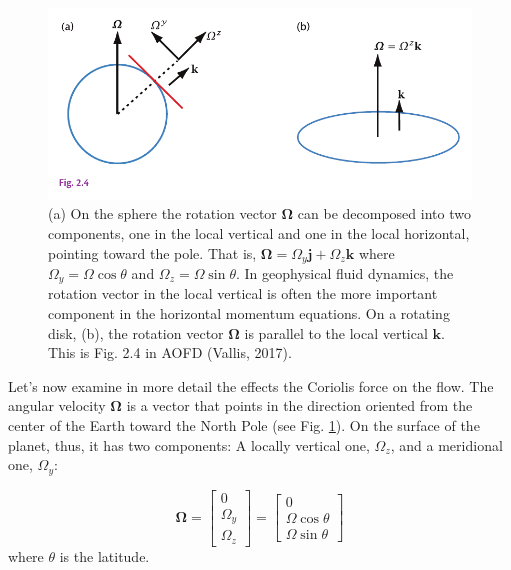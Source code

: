 \documentclass[12pt]{article}
\numberwithin{equation}{section}
\numberwithin{figure}{section}
\numberwithin{table}{section}
\begin{document}
\begin{figure}[h]
  \centering
  \includegraphics[width=\textwidth]{assets/fig_rotation_components.pdf}
  \caption{
    (a) On the sphere the rotation vector $\mathbf{\Omega}$ can be decomposed
    into two components, one in the local vertical and one in the local horizontal,
    pointing toward the pole. That is, $\mathbf{\Omega} = \Omega_y \mathbf{j} + \Omega_z \mathbf{k}$
    where $\Omega_y = \Omega \cos\theta$ and $\Omega_z = \Omega \sin\theta$.
    In geophysical fluid dynamics, the rotation vector in the local vertical
    is often the more important component in the horizontal momentum equations.
    On a rotating disk, (b), the rotation vector $\mathbf{\Omega}$ is parallel
    to the local vertical $\mathbf{k}$.
    This is Fig. 2.4 in AOFD (Vallis, 2017).
  }
  \label{fig:rotation_components}
\end{figure}

Let's now examine in more detail the effects the Coriolis force on the flow.
The angular velocity $\mathbf{\Omega}$ is a vector that points in the direction
oriented from the center of the Earth toward the North Pole
(see Fig. \ref{fig:rotation_components}).
On the surface of the planet, thus, it has two components: A locally vertical
one, $\Omega_z$, and a meridional one, $\Omega_y$:

\begin{equation}
  \mathbf{\Omega} =
  \begin{bmatrix}
    0 \\
    \Omega_y \\
    \Omega_z
  \end{bmatrix} = 
  \begin{bmatrix}
    0 \\
    \Omega \cos\theta \\
    \Omega \sin\theta
  \end{bmatrix}
\end{equation}
where $\theta$ is the latitude.
\end{document}
